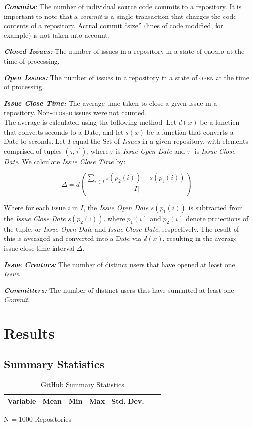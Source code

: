 \documentclass{proc}
\begin{document}
{{{{{{{\noindent \textbf{\textit{Commits:}}
The number of individual source code commits to a repository. It is important to note that a \textit{commit} is a single transaction that changes the code contents of a repository. Actual commit ``size'' (lines of code modified, for example) is not taken into account.

\noindent \textbf{\textit{Closed Issues:}}
The number of issues in a repository in a state of \textsc{closed} at the time of processing.

\noindent \textbf{\textit{Open Issues:}}
The number of issues in a repository in a state of \textsc{open} at the time of processing.

\noindent \textbf{\textit{Issue Close Time:}}
The average time taken to close a given issue in a repository. Non-\textsc{closed} issues were not counted.\\

The average is calculated using the following method. Let $d(x)$ be a function that converts seconds to a Date, and let $s(x)$ be a function that converts a Date to seconds. Let $I$ equal the Set of \textit{Issues} in a given repository, with elements comprised of tuples $(\tau, \tau^\prime)$, where $\tau$ is \textit{Issue Open Date} and $\tau^\prime$ is \textit{Issue Close Date}. We calculate \textit{Issue Close Time} by: 

\[ \Delta = d\left( \frac{\sum_{i \in I} s\left(p_{2}(i) \right) - s\left(p_{1}(i) \right)  } {|I|} \right) \]

Where for each issue $i$ in $I$, the \textit{Issue Open Date} $s( p_{1}(i))$ is subtracted from the \textit{Issue Close Date} $s( p_{2}(i))$, where $p_{1}(i)$ and $p_{2}(i)$ denote projections of the tuple, or \textit{Issue Open Date} and \textit{Issue Close Date}, respectively. The result of this is averaged and converted into a Date via $d(x)$, resulting in the average issue close time interval $\Delta$.

\noindent \textbf{\textit{Issue Creators:}}
The number of distinct users that have opened at least one \textit{Issue}.

\noindent \textbf{\textit{Committers:}}
The number of distinct users that have summited at least one \textit{Commit}.

\section{Results}

\subsection{Summary Statistics}
\begin{table}[!ht]
\begin{center}
\begin{tabular}{rrrrrrr}
\hline
Variable & Mean & Min & Max & Std. Dev. \\
\hline

\hline
\end{tabular}
N = 1000 Repositories
\caption{GitHub Summary Statistics}
\label{table:summary_stats}
\end{center}
\end{table}

}}}}}}}
\end{document}
